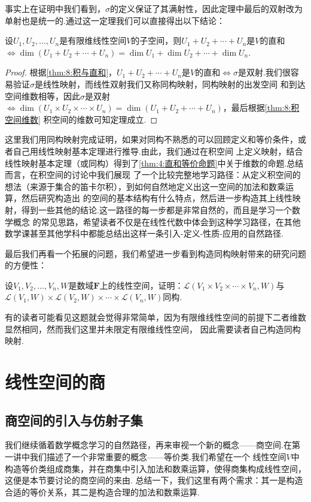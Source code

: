 事实上在证明中我们看到，$\sigma$的定义保证了其满射性，因此定理中最后的双射改为单射也是统一的.通过这一定理我们可以直接得出以下结论：
\begin{theorem}
    设$U_1,U_2,\ldots,U_n$是有限维线性空间$V$的子空间，则$U_1+U_2+\cdots+U_n$是$V$的直和$\iff \dim(U_1+U_2+\cdots+U_n)=\dim U_1+\dim U_2+\cdots+\dim U_n$.
\end{theorem}
\begin{proof}
    根据\autoref{thm:8:积与直和}，$U_1+U_2+\cdots+U_n$是$V$的直和$\iff \sigma$是双射.我们很容易验证$\sigma$是线性映射，而线性双射我们又称同构映射，同构映射的出发空间
    和到达空间维数相等，因此$\sigma$是双射$\iff \dim(U_1 \times U_2 \times \cdots \times U_n)=\dim(U_1+U_2+\cdots+U_n)$，最后根据\autoref{thm:8:积空间维数}
    积空间的维数可知定理成立.
\end{proof}

这里我们用同构映射完成证明，如果对同构不熟悉的可以回顾定义和等价条件，或者自己用线性映射基本定理进行推导.由此，我们通过在积空间
上定义映射，结合线性映射基本定理（或同构）得到了\autoref{thm:4:直和等价命题}中关于维数的命题.总结而言，在积空间的讨论中我们展现
了一个比较完整地学习路径：从定义积空间的想法（来源于集合的笛卡尔积），到如何自然地定义出这一空间的加法和数乘运算，然后研究构造出
的空间的基本结构有什么特点，然后进一步构造其上线性映射，得到一些其他的结论.这一路径的每一步都是非常自然的，而且是学习一个数学概念
的常见思路，希望读者不仅是在线性代数中体会到这种学习路径，在其他数学课甚至其他学科中都能总结出这样一条引入-定义-性质-应用的自然路径.

最后我们再看一个拓展的问题，我们希望进一步看到构造同构映射带来的研究问题的方便性：
\begin{example}
    设$V_1,V_2,\ldots,V_n,W$是数域$\mathbf{F}$上的线性空间，证明：$\mathcal{L}(V_1 \times V_2 \times \cdots \times V_n,W)$与
    $\mathcal{L}(V_1,W) \times \mathcal{L}(V_2,W) \times \cdots \times \mathcal{L}(V_n,W)$同构.
\end{example}
有的读者可能看见这题就会觉得非常简单，因为有限维线性空间的前提下二者维数显然相同，然而我们这里并未限定有限维线性空间，
因此需要读者自己构造同构映射.

\begin{solution}

\end{solution}

\section{线性空间的商}
\subsection{商空间的引入与仿射子集}
我们继续循着数学概念学习的自然路径，再来审视一个新的概念——商空间.在第一讲中我们描述了一个非常重要的概念——等价类.我们希望在一个
线性空间$V$中构造等价类组成商集，并在商集中引入加法和数乘运算，使得商集构成线性空间，这便是本节要讨论的商空间的来由.
总结一下，我们这里有两个需求：其一是构造合适的等价关系，其二是构造合理的加法和数乘运算.

